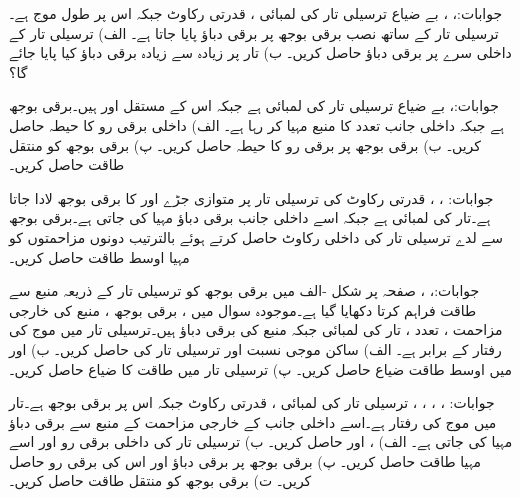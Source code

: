 جوابات:، ، 
بے ضیاع ترسیلی تار کی لمبائی ، قدرتی رکاوٹ  جبکہ اس  پر طول موج  ہے۔ترسیلی تار کے ساتھ نصب برقی بوجھ  پر  برقی دباؤ پایا جاتا ہے۔ الف) ترسیلی تار کے داخلی سرے پر برقی دباؤ حاصل کریں۔ ب) تار پر زیادہ سے زیادہ برقی دباؤ کیا پایا جائے گا؟

جوابات:، 
بے ضیاع ترسیلی تار کی لمبائی  ہے جبکہ اس کے مستقل  اور  ہیں۔برقی بوجھ  ہے جبکہ داخلی جانب  تعدد کا منبع  مہیا کر رہا ہے۔ الف) داخلی برقی رو کا حیطہ حاصل کریں۔ ب) برقی بوجھ پر برقی رو کا حیطہ حاصل کریں۔ پ) برقی بوجھ کو منتقل طاقت حاصل کریں۔

جوابات: ، ، 
 قدرتی رکاوٹ کی ترسیلی تار پر متوازی جڑے  اور  کا برقی بوجھ لادا جاتا ہے۔تار کی لمبائی  ہے جبکہ اسے داخلی جانب  برقی دباؤ مہیا کی جاتی ہے۔برقی بوجھ سے لدے ترسیلی تار کی داخلی رکاوٹ  حاصل کرتے ہوئے  بالترتیب دونوں مزاحمتوں کو مہیا اوسط طاقت حاصل کریں۔

جوابات:، ، 
صفحہ  پر شکل -الف میں برقی بوجھ کو ترسیلی تار کے ذریعہ منبع سے طاقت فراہم کرتا دکھایا گیا ہے۔موجودہ سوال میں ، برقی  بوجھ ، منبع کی خارجی مزاحمت ، تعدد ، تار کی لمبائی  جبکہ منبع کی برقی دباؤ  ہیں۔ترسیلی تار میں موج کی رفتار  کے برابر ہے۔ الف) ساکن موجی نسبت  اور ترسیلی تار کی  حاصل کریں۔ ب)   اور  میں اوسط طاقت ضیاع حاصل کریں۔  پ) ترسیلی تار میں طاقت کا ضیاع حاصل کریں۔   

جوابات: ، ، ، ، 
ترسیلی تار کی لمبائی ، قدرتی رکاوٹ  جبکہ اس پر برقی بوجھ  ہے۔تار میں موج کی رفتار  ہے۔اسے داخلی جانب  کے خارجی مزاحمت کے منبع سے  برقی دباؤ مہیا کی جاتی ہے۔ الف) ،  اور  حاصل کریں۔ ب) ترسیلی تار کی داخلی برقی رو اور اسے مہیا طاقت حاصل کریں۔ پ)  برقی بوجھ پر برقی دباؤ اور اس کی برقی رو حاصل کریں۔ ت) برقی بوجھ کو منتقل طاقت حاصل کریں۔

